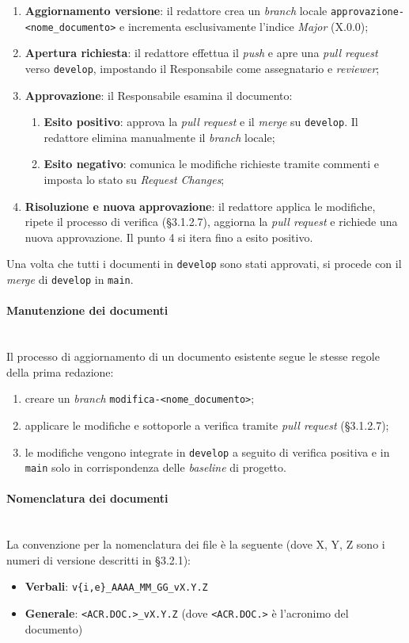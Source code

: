 \documentclass[10pt, letterpaper]{article}
\newcommand{\trisubsection}[1]{\paragraph{#1}\mbox{}\\}
\begin{document}
\begin{enumerate}
    \item \textbf{Aggiornamento versione}: il redattore crea un \textit{branch} locale \texttt{approvazione-<nome\_documento>} e incrementa esclusivamente l'indice \textit{Major} (X.0.0);
    \item \textbf{Apertura richiesta}: il redattore effettua il \textit{push} e apre una \textit{pull request} verso \texttt{develop}, impostando il Responsabile come assegnatario e \textit{reviewer};
    \item \textbf{Approvazione}: il Responsabile esamina il documento:
    \begin{enumerate}
        \item \textbf{Esito positivo}: approva la \textit{pull request} e il \textit{merge} su \texttt{develop}. Il redattore elimina manualmente il \textit{branch} locale;
        \item \textbf{Esito negativo}: comunica le modifiche richieste tramite commenti e imposta lo stato su \textit{Request Changes};
    \end{enumerate}
    \item \textbf{Risoluzione e nuova approvazione}: il redattore applica le modifiche, ripete il processo di verifica (§3.1.2.7), aggiorna la \textit{pull request} e richiede una nuova approvazione. Il punto 4 si itera fino a esito positivo.
\end{enumerate}
Una volta che tutti i documenti in \texttt{develop} sono stati approvati, si procede con il \textit{merge} di \texttt{develop} in \texttt{main}.

\trisubsection{Manutenzione dei documenti}
Il processo di aggiornamento di un documento esistente segue le stesse regole della prima redazione:
\begin{enumerate}
    \item creare un \textit{branch} \texttt{modifica-<nome\_documento>};
    \item applicare le modifiche e sottoporle a verifica tramite \textit{pull request} (§3.1.2.7);
    \item le modifiche vengono integrate in \texttt{develop} a seguito di verifica positiva e in \texttt{main} solo in corrispondenza delle \textit{baseline} di progetto.
\end{enumerate}

\trisubsection{Nomenclatura dei documenti}
La convenzione per la nomenclatura dei file è la seguente (dove X, Y, Z sono i numeri di versione descritti in §3.2.1):
\begin{itemize}
    \item \textbf{Verbali}: \texttt{v\{i,e\}\_AAAA\_MM\_GG\_vX.Y.Z}
    \item \textbf{Generale}: \texttt{<ACR.DOC.>\_vX.Y.Z} (dove \texttt{<ACR.DOC.>} è l'acronimo del documento)
\end{itemize}
\end{document}
